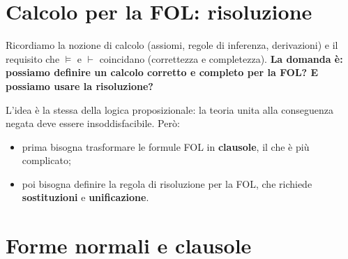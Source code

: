 
\section{Calcolo per la FOL: risoluzione}

Ricordiamo la nozione di calcolo (assiomi, regole di inferenza, derivazioni)
e il requisito che $\models$ e $\vdash$ coincidano (correttezza e
completezza). \textbf{La domanda è: possiamo definire un calcolo corretto e
completo per la FOL? E possiamo usare la risoluzione?}

L'idea è la stessa della logica proposizionale: la teoria unita alla
conseguenza negata deve essere insoddisfacibile. Però:
\begin{itemize}
  \item prima bisogna trasformare le formule FOL in \textbf{clausole}, il che
        è più complicato;
  \item poi bisogna definire la regola di risoluzione per la FOL, che
        richiede \textbf{sostituzioni} e \textbf{unificazione}.
\end{itemize}

\section{Forme normali e clausole}


